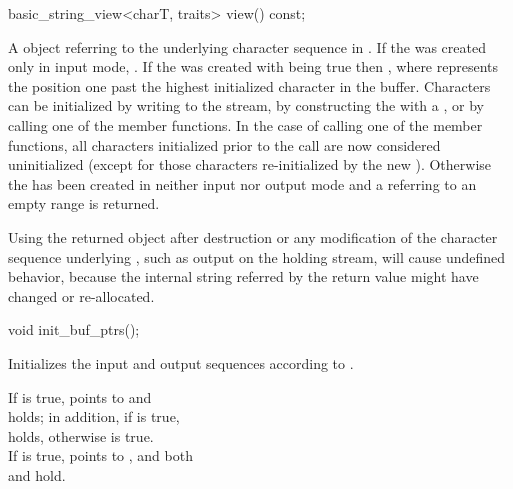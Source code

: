 \documentclass[ebook,11pt,article]{memoir}
\begin{document}
\begin{insrt}
\begin{itemdecl}
basic_string_view<charT, traits> view() const;
\end{itemdecl}
\begin{itemdescr}
\pnum
\returns A  object referring to the  underlying character sequence
in . 
If the  was created only in input mode,  
. 
If the  was created with  being true 
then , 
where  represents the position one past the highest initialized character in the buffer. 
Characters can be initialized by writing to the stream, 
by constructing the  with a , 
or by calling one of the  member functions. 
In the case of calling one of the  member functions, 
all characters initialized prior to the call are now considered uninitialized 
(except for those characters re-initialized by the new ). 
Otherwise the  has been created in neither input nor output mode 
and a  referring to an empty range is returned. 

\pnum
\begin{note}
Using the returned  object after destruction or any modification of the character sequence underlying , such as output on the holding stream, will cause undefined behavior, because the internal string referred by the return value might have changed or re-allocated. 
\end{note}
\end{itemdescr}


\begin{itemdecl}
void init_buf_ptrs();
\end{itemdecl}
\begin{itemdescr}
\pnum
\effects 
Initializes the input and output sequences according to .

\pnum
\ensures
If  is true, 
 points to  and \\ holds; 
in addition, if  is true, \\
 holds, 
otherwise  is true. \\
If  is true, 
 points to , 
and both \\ and  hold.


\end{itemdescr}
\end{insrt}
\end{document}

